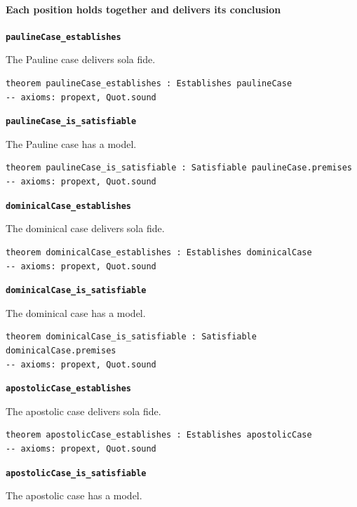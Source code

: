 \documentclass[11pt]{article}
\begin{document}
\paragraph*{Each position holds together and delivers its conclusion}
\leavevmode\par
\par\medskip\noindent\textbf{\texttt{pauline\allowbreak{}Case\_\allowbreak{}establishes}}\par\nobreak\noindent
The Pauline case delivers sola fide.

{\small\begin{verbatim}
theorem paulineCase_establishes : Establishes paulineCase
-- axioms: propext, Quot.sound
\end{verbatim}}
\par\medskip\noindent\textbf{\texttt{pauline\allowbreak{}Case\_\allowbreak{}is\_\allowbreak{}satisfiable}}\par\nobreak\noindent
The Pauline case has a model.

{\small\begin{verbatim}
theorem paulineCase_is_satisfiable : Satisfiable paulineCase.premises
-- axioms: propext, Quot.sound
\end{verbatim}}
\par\medskip\noindent\textbf{\texttt{dominical\allowbreak{}Case\_\allowbreak{}establishes}}\par\nobreak\noindent
The dominical case delivers sola fide.

{\small\begin{verbatim}
theorem dominicalCase_establishes : Establishes dominicalCase
-- axioms: propext, Quot.sound
\end{verbatim}}
\par\medskip\noindent\textbf{\texttt{dominical\allowbreak{}Case\_\allowbreak{}is\_\allowbreak{}satisfiable}}\par\nobreak\noindent
The dominical case has a model.

{\small\begin{verbatim}
theorem dominicalCase_is_satisfiable : Satisfiable dominicalCase.premises
-- axioms: propext, Quot.sound
\end{verbatim}}
\par\medskip\noindent\textbf{\texttt{apostolic\allowbreak{}Case\_\allowbreak{}establishes}}\par\nobreak\noindent
The apostolic case delivers sola fide.

{\small\begin{verbatim}
theorem apostolicCase_establishes : Establishes apostolicCase
-- axioms: propext, Quot.sound
\end{verbatim}}
\par\medskip\noindent\textbf{\texttt{apostolic\allowbreak{}Case\_\allowbreak{}is\_\allowbreak{}satisfiable}}\par\nobreak\noindent
The apostolic case has a model.
\end{document}

